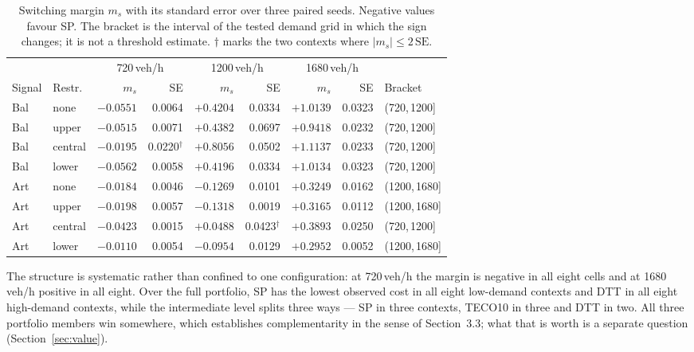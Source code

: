 \documentclass[runningheads]{llncs}
\begin{document}
\begin{table}[htb]
\centering\footnotesize
\caption{Switching margin $m_s$ with its standard error over three paired seeds.
Negative values favour SP. The bracket is the interval of the tested demand grid in
which the sign changes; it is not a threshold estimate. $\dagger$ marks the two contexts
where $|m_s|\le 2\,\mathrm{SE}$.}
\label{tab:margin}
\setlength{\tabcolsep}{2.9pt}
\begin{tabular}{@{}llrrrrrrl@{}}
\toprule
& & \multicolumn{2}{c}{720\,veh/h} & \multicolumn{2}{c}{1200\,veh/h}
& \multicolumn{2}{c}{1680\,veh/h} & \\
\cmidrule(lr){3-4}\cmidrule(lr){5-6}\cmidrule(lr){7-8}
Signal & Restr. & $m_s$ & SE & $m_s$ & SE & $m_s$ & SE & Bracket\\
\midrule
Bal & none & $-0.0551$ & 0.0064 & $+0.4204$ & 0.0334 & $+1.0139$ & 0.0323 & (720,\,1200]\\
Bal & upper & $-0.0515$ & 0.0071 & $+0.4382$ & 0.0697 & $+0.9418$ & 0.0232 & (720,\,1200]\\
Bal & central & $-0.0195$ & 0.0220$^{\dagger}$ & $+0.8056$ & 0.0502 & $+1.1137$ & 0.0233 & (720,\,1200]\\
Bal & lower & $-0.0562$ & 0.0058 & $+0.4196$ & 0.0334 & $+1.0134$ & 0.0323 & (720,\,1200]\\
\midrule
Art & none & $-0.0184$ & 0.0046 & $-0.1269$ & 0.0101 & $+0.3249$ & 0.0162 & (1200,\,1680]\\
Art & upper & $-0.0198$ & 0.0057 & $-0.1318$ & 0.0019 & $+0.3165$ & 0.0112 & (1200,\,1680]\\
Art & central & $-0.0423$ & 0.0015 & $+0.0488$ & 0.0423$^{\dagger}$ & $+0.3893$ & 0.0250 & (720,\,1200]\\
Art & lower & $-0.0110$ & 0.0054 & $-0.0954$ & 0.0129 & $+0.2952$ & 0.0052 & (1200,\,1680]\\
\bottomrule
\end{tabular}
\end{table}

The structure is systematic rather than confined to one configuration: at 720\,veh/h the
margin is negative in all eight cells and at 1680\,veh/h positive in all eight. Over the
full portfolio, SP has the lowest observed cost in all eight low-demand contexts and DTT
in all eight high-demand contexts, while the intermediate level splits three ways --- SP
in three contexts, TECO10 in three and DTT in two. All three portfolio members win
somewhere, which establishes complementarity in the sense of Section~3.3; what that is
worth is a separate question (Section~\ref{sec:value}).
\end{document}
